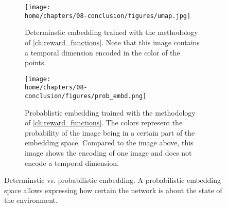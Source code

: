 \documentclass[\home/main.tex]{subfiles}
\begin{document}
\begin{figure}[htpb]{}
    \centering
    \begin{subfigure}[b]{0.90\textwidth}
        \centering
        \texttt{[image: \\home/chapters/08-conclusion/figures/umap.jpg]}
        \caption{Determinstic embedding trained with the methodology of \cref{ch:reward_functions}. Note that this image contains a temporal dimension encoded in the color of the points.}
        \label{fig:determinstic_embd}
    \end{subfigure}
    \par\bigskip %
    \begin{subfigure}[b]{0.90\textwidth}
        \centering
        \texttt{[image: \\home/chapters/08-conclusion/figures/prob\_embd.png]}
        \caption{Probablistic embedding trained with the methodology of \cref{ch:reward_functions}. The colors represent the probability of the image being in a certain part of the embedding space. Compared to the image above, this image shows the encoding of one image and does not encode a temporal dimension.}
        \label{fig:prob_embd}
    \end{subfigure}

    \caption[]{Determinstic vs. probabilistic embedding. A probabilistic embedding space allows expressing how certain the network is about the state of the environment.}
    \label{fig:stoch_embd}
\end{figure}

\end{document}

